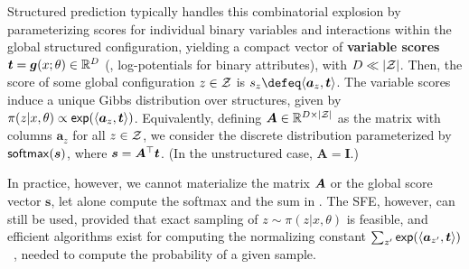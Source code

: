 Structured prediction typically handles this combinatorial explosion
by parameterizing scores for individual binary variables and
interactions within the global structured configuration, yielding a
compact vector of \textbf{variable scores} $\bm{t} = \g(x; \theta)
\in \mathbb{R}^D$ (\eg, log-potentials for binary attributes), with
$D \ll |\ZZ|$. Then, the score of some global configuration $z \in
\ZZ$ is $s_z \defeq \DP{\bm{a}_z}{\bm{t}}$. The variable scores
induce a unique Gibbs distribution over structures, given by
$\pi(z|x,\theta) \propto \exp(\DP{\bm{a}_{z}}{\bm{t}})$.
Equivalently, defining $\bm{A} \in \mathbb{R}^{D \times |\ZZ|}$ as
the matrix with columns $\bm{a}_{z}$ for all $z \in \ZZ$, we consider
the discrete distribution parameterized by $\softmax(\s)$, where
$\s=\bm{A}^\top \bm{t}$. (In the unstructured case, $\bm{A}=\bm{I}$.)

In practice, however, we cannot materialize the matrix $\AA$ or the
global score vector $\bm{s}$, let alone compute the softmax and the
sum in . The SFE, however, can still be used, provided
that exact sampling of $z\sim\pi(z | x, \theta)$ is feasible, and
efficient algorithms exist for computing the normalizing constant
$\sum_{z'}\exp(\DP{\bm{a}_{z'}}{\bm{t}})$~\citep{WJ2008}, needed to
compute the probability of a given sample.
